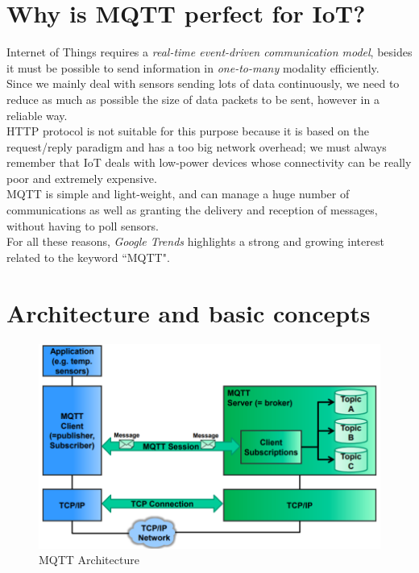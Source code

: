 \documentclass[12pt]{report}
\begin{document}
{%

\section{Why is MQTT perfect for IoT?}
\bigskip
Internet of Things requires a \emph{real-time event-driven communication model}, besides it must be possible to send information in \emph{one-to-many} modality efficiently.\\
Since we mainly deal with sensors sending lots of data continuously, we need to reduce as much as possible the size of data packets to be sent, however in a reliable way.\\

HTTP protocol is not suitable for this purpose because it is based on the request/reply paradigm and has a too big network overhead; we must always remember that IoT deals with low-power devices whose connectivity can be really poor and extremely expensive.\\

MQTT is simple and light-weight, and can manage a huge number of communications as well as granting the delivery and reception of messages, without having to poll sensors.\\

For all these reasons, \emph{Google Trends} highlights a strong and growing interest related to the keyword ``MQTT".


\section{Architecture and basic concepts}
\begin{figure}[H]
\includegraphics{mqtt_architecture}
\caption{MQTT Architecture}
\label{fig:mqttArchitecture}
\end{figure}

}
\end{document}
